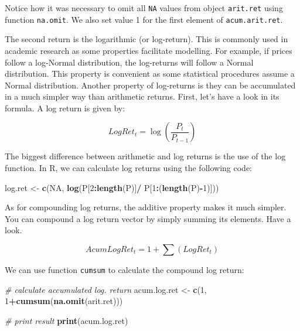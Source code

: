\documentclass[11pt,]{book}
\newenvironment{Shaded}{\begin{snugshade}}{\end{snugshade}}
\newcommand{\KeywordTok}[1]{\textcolor[rgb]{0.27,0.27,0.27}{\textbf{#1}}}
\newcommand{\DecValTok}[1]{\textcolor[rgb]{0.06,0.06,0.06}{#1}}
\newcommand{\StringTok}[1]{\textcolor[rgb]{0.5,0.5,0.5}{#1}}
\newcommand{\CommentTok}[1]{\textcolor[rgb]{0.56,0.35,0.01}{\textit{#1}}}
\newcommand{\OtherTok}[1]{\textcolor[rgb]{0.56,0.35,0.01}{#1}}
\newcommand{\OperatorTok}[1]{\textcolor[rgb]{0.81,0.36,0.00}{\textbf{#1}}}
\newcommand{\NormalTok}[1]{#1}
\begin{document}
Notice how it was necessary to omit all \texttt{NA} values from object
\texttt{arit.ret} using function \texttt{na.omit}. We also set value 1
for the first element of \texttt{acum.arit.ret}.

The second return is the logarithmic (or log-return). This is commonly
used in academic research as some properties facilitate modelling. For
example, if prices follow a log-Normal distribution, the log-returns
will follow a Normal distribution. This property is convenient as some
statistical procedures assume a Normal distribution. Another property of
log-returns is they can be accumulated in a much simpler way than
arithmetic returns. First, let's have a look in its formula. A log
return is given by:

\[LogRet_t = \log\left ( \frac{P_t}{P_{t-1}} \right )\]

The biggest difference between arithmetic and log returns is the use of
the log function. In R, we can calculate log returns using the following
code:

\begin{Shaded}
\begin{Highlighting}[]
\NormalTok{log.ret <-}\StringTok{ }\KeywordTok{c}\NormalTok{(}\OtherTok{NA}\NormalTok{, }\KeywordTok{log}\NormalTok{(P[}\DecValTok{2}\OperatorTok{:}\KeywordTok{length}\NormalTok{(P)]}\OperatorTok{/}
\StringTok{                     }\NormalTok{P[}\DecValTok{1}\OperatorTok{:}\NormalTok{(}\KeywordTok{length}\NormalTok{(P)}\OperatorTok{-}\DecValTok{1}\NormalTok{)]))}
\end{Highlighting}
\end{Shaded}

As for compounding log returns, the additive property makes it much
simpler. You can compound a log return vector by simply summing its
elements. Have a look.

\[AcumLogRet_t = 1+ \sum\left (LogRet _t \right ) \]

We can use function \texttt{cumsum} to calculate the compound log
return: 

\begin{Shaded}
\begin{Highlighting}[]
\CommentTok{# calculate accumulated log. return}
\NormalTok{acum.log.ret <-}\StringTok{ }\KeywordTok{c}\NormalTok{(}\DecValTok{1}\NormalTok{, }\DecValTok{1}\OperatorTok{+}\KeywordTok{cumsum}\NormalTok{(}\KeywordTok{na.omit}\NormalTok{(arit.ret)))}
                  
\CommentTok{# print result}
\KeywordTok{print}\NormalTok{(acum.log.ret)}
\end{Highlighting}
\end{Shaded}
\end{document}
